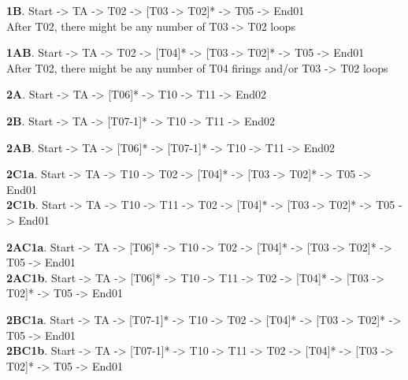 \documentclass[]{article}
\begin{document}
\textbf{1B}. Start -\textgreater{} TA -\textgreater{} T02
-\textgreater{} {[}T03 -\textgreater{} T02{]}* -\textgreater{} T05
-\textgreater{} End01\\ After T02, there might be any number of T03
-\textgreater{} T02 loops

\textbf{1AB}. Start -\textgreater{} TA -\textgreater{} T02
-\textgreater{} {[}T04{]}* -\textgreater{} {[}T03 -\textgreater{}
T02{]}* -\textgreater{} T05 -\textgreater{} End01\\ After T02, there
might be any number of T04 firings and/or T03 -\textgreater{} T02 loops

\textbf{2A}. Start -\textgreater{} TA -\textgreater{} {[}T06{]}*
-\textgreater{} T10 -\textgreater{} T11 -\textgreater{} End02

\textbf{2B}. Start -\textgreater{} TA -\textgreater{} {[}T07-1{]}*
-\textgreater{} T10 -\textgreater{} T11 -\textgreater{} End02

\textbf{2AB}. Start -\textgreater{} TA -\textgreater{} {[}T06{]}*
-\textgreater{} {[}T07-1{]}* -\textgreater{} T10 -\textgreater{} T11
-\textgreater{} End02

\textbf{2C1a}. Start -\textgreater{} TA -\textgreater{} T10
-\textgreater{} T02 -\textgreater{} {[}T04{]}* -\textgreater{} {[}T03
-\textgreater{} T02{]}* -\textgreater{} T05 -\textgreater{}
End01\\\textbf{2C1b}. Start -\textgreater{} TA -\textgreater{} T10
-\textgreater{} T11 -\textgreater{} T02 -\textgreater{} {[}T04{]}*
-\textgreater{} {[}T03 -\textgreater{} T02{]}* -\textgreater{} T05
-\textgreater{} End01

\textbf{2AC1a}. Start -\textgreater{} TA -\textgreater{} {[}T06{]}*
-\textgreater{} T10 -\textgreater{} T02 -\textgreater{} {[}T04{]}*
-\textgreater{} {[}T03 -\textgreater{} T02{]}* -\textgreater{} T05
-\textgreater{} End01\\\textbf{2AC1b}. Start -\textgreater{} TA
-\textgreater{} {[}T06{]}* -\textgreater{} T10 -\textgreater{} T11
-\textgreater{} T02 -\textgreater{} {[}T04{]}* -\textgreater{} {[}T03
-\textgreater{} T02{]}* -\textgreater{} T05 -\textgreater{} End01

\textbf{2BC1a}. Start -\textgreater{} TA -\textgreater{} {[}T07-1{]}*
-\textgreater{} T10 -\textgreater{} T02 -\textgreater{} {[}T04{]}*
-\textgreater{} {[}T03 -\textgreater{} T02{]}* -\textgreater{} T05
-\textgreater{} End01\\\textbf{2BC1b}. Start -\textgreater{} TA
-\textgreater{} {[}T07-1{]}* -\textgreater{} T10 -\textgreater{} T11
-\textgreater{} T02 -\textgreater{} {[}T04{]}* -\textgreater{} {[}T03
-\textgreater{} T02{]}* -\textgreater{} T05 -\textgreater{} End01
\end{document}

